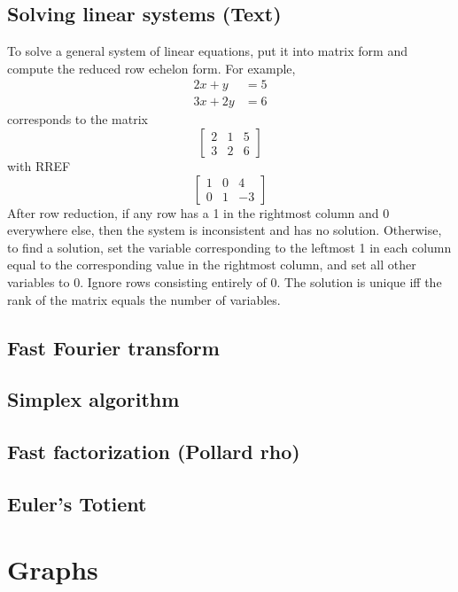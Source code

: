 \documentclass[9pt]{extarticle}
\begin{document}
\begin{multicols}{3}
\subsection{Solving linear systems (Text)}
To solve a general system of linear equations, put it into matrix form and compute the reduced row echelon form. For example,
\begin{align*}2x + y &= 5 \\ 3x + 2y &= 6\end{align*}
corresponds to the matrix
\[ \left[ \begin{array}{cc|c} 2 & 1 & 5 \\ 3 & 2 & 6 \end{array} \right] \]
with RREF
\[ \left[ \begin{array}{cc|c} 1 & 0 & 4 \\ 0 & 1 & -3 \end{array} \right] \]
After row reduction, if any row has a 1 in the rightmost column and 0 everywhere else, then the system is inconsistent and has no solution. Otherwise, to find a solution, set the variable corresponding to the leftmost 1 in each column equal to the corresponding value in the rightmost column, and set all other variables to 0. Ignore rows consisting entirely of 0. The solution is unique iff the rank of the matrix equals the number of variables.

\subsection{Fast Fourier transform}


\subsection{Simplex algorithm}


\subsection{Fast factorization (Pollard rho)}


\subsection{Euler's Totient}


\section{Graphs}


\end{multicols}
\end{document}
